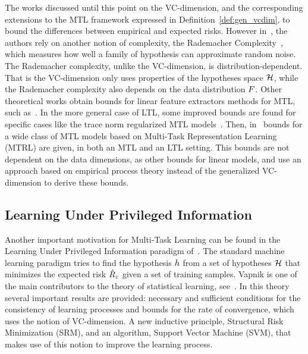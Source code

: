 %
The works discussed until this point on the VC-dimension, and the corresponding extensions to the MTL framework expressed in Definition~\ref{def:gen_vcdim}, to bound the differences between empirical and expected risks.
%
However in~\cite{AndoZ05}, the authors rely on another notion  of complexity, the Rademacher Complexity~\cite{BartlettM02}, which measures how well a family of hypothesis can approximate random noise. The Rademacher complexity, unlike the VC-dimension, is distribution-dependent. That is the VC-dimension only uses properties of the hypotheses space $\mathcal{H}$, while the Rademacher complexity also depends on the data distribution $F$. 
Other theoretical works obtain bounds for linear feature extractors methods for MTL, such as~\cite{CavallantiCG10,Maurer06, Maurer06rad}.
In the more general case of LTL, some improved bounds are found for specific cases like the trace norm regularized MTL models~\cite{MaurerPR13}.
Then, in~\cite{MaurerPR16} bounds for a wide class of MTL models based on Multi-Task Representation Learning (MTRL) are given, in both an MTL and an LTL setting. This bounds are not dependent on the data dimensions, as other bounds for linear models, and use an approach based on empirical process theory instead of the generalized VC-dimension to derive these bounds.


\subsection{Learning Under Privileged Information}\label{subsec:ch3_lupi}
Another important motivation for Multi-Task Learning can be found in the Learning Under Privileged Information paradigm of~\cite{VapnikI15a}.
The standard machine learning paradigm tries to find the hypothesis $h$ from a set of hypotheses $\mathcal{H}$ that minimizes the expected risk $\hat{R}_z$ given a set of training samples.
Vapnik is one of the main contributors to the theory of statistical learning, see~\cite{Vapnik00}. In this theory several important results are provided: necessary and sufficient conditions for the consistency of learning processes and bounds for the rate of convergence, which uses the notion of VC-dimension. A new inductive principle, Structural Risk Minimization (SRM), and an algorithm, Support Vector Machine (SVM), that makes use of this notion to improve the learning process.

